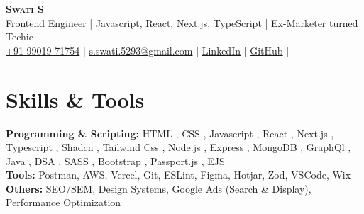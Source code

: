 \documentclass[letterpaper,11pt]{article}
\newcommand{\resumeSubHeadingListStart}{\begin{itemize}[leftmargin=0.15in, label={}]}
\newcommand{\resumeSubHeadingListEnd}{\end{itemize}}
\begin{document}

\begin{center}
  \textbf{\Huge \scshape Swati S} \\ \vspace{3pt}
  \normalsize Frontend Engineer | Javascript, React, Next.js, TypeScript | Ex-Marketer turned Techie \\ \vspace{3pt}
  \small
   \faMobile \hspace{.5pt} \href{tel:+919901971754}{+91 99019 71754}
  $|$
  \faAt \hspace{.5pt} \href{mailto:s.swati.5293@gmail.com}{s.swati.5293@gmail.com}
  $|$
  \faLinkedinSquare \hspace{.5pt} \href{https://www.linkedin.com/in/swatis1/}{LinkedIn}
  $|$
  \faGithub \hspace{.5pt} \href{https://github.com/sswadi}{GitHub}
  $|$
  \faMapMarker \hspace{.5pt}{B'lore, India}
\end{center}


\section{Skills \& Tools}
\vspace{2pt}
\resumeSubHeadingListStart
\small{\item{
              \textbf{Programming \& Scripting:}{ HTML , CSS , Javascript , React , Next.js , Typescript , Shadcn , Tailwind Css , Node.js , Express , MongoDB , GraphQl , Java , DSA , SASS , Bootstrap , Passport.js , EJS} \\ \vspace{3pt}
              \textbf{Tools:} Postman, AWS, Vercel, Git, ESLint, Figma, Hotjar, Zod, VSCode, Wix\\ \vspace{3pt}
              \textbf{Others:} SEO/SEM, Design Systems, Google Ads (Search \& Display), Performance Optimization
}}
\resumeSubHeadingListEnd

\end{document}
